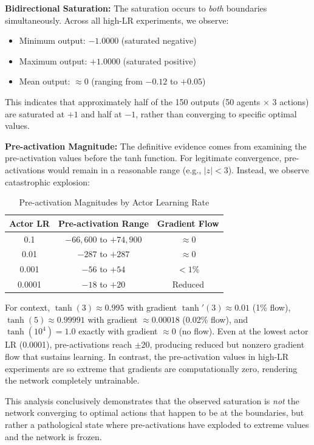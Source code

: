 \textbf{Bidirectional Saturation:} The saturation occurs to \textit{both} boundaries simultaneously. Across all high-LR experiments, we observe:
\begin{itemize}
    \item Minimum output: $-1.0000$ (saturated negative)
    \item Maximum output: $+1.0000$ (saturated positive)
    \item Mean output: $\approx 0$ (ranging from $-0.12$ to $+0.05$)
\end{itemize}
This indicates that approximately half of the 150 outputs (50 agents $\times$ 3 actions) are saturated at $+1$ and half at $-1$, rather than converging to specific optimal values.

\textbf{Pre-activation Magnitude:} The definitive evidence comes from examining the pre-activation values before the tanh function. For legitimate convergence, pre-activations would remain in a reasonable range (e.g., $|z| < 3$). Instead, we observe catastrophic explosion:

\begin{table}[htbp]
\caption{Pre-activation Magnitudes by Actor Learning Rate}
\label{tab:preactivation}
\centering
\small
\begin{tabular}{ccc}
\toprule
\textbf{Actor LR} & \textbf{Pre-activation Range} & \textbf{Gradient Flow} \\
\midrule
0.1 & $-66,600$ to $+74,900$ & $\approx 0$ \\
0.01 & $-287$ to $+287$ & $\approx 0$ \\
0.001 & $-56$ to $+54$ & $< 1\%$ \\
0.0001 & $-18$ to $+20$ & Reduced \\
\bottomrule
\end{tabular}
\end{table}

For context, $\tanh(3) \approx 0.995$ with gradient $\tanh'(3) \approx 0.01$ (1\% flow), $\tanh(5) \approx 0.99991$ with gradient $\approx 0.00018$ (0.02\% flow), and $\tanh(10^4) = 1.0$ exactly with gradient $\approx 0$ (no flow). Even at the lowest actor LR (0.0001), pre-activations reach $\pm 20$, producing reduced but nonzero gradient flow that sustains learning. In contrast, the pre-activation values in high-LR experiments are so extreme that gradients are computationally zero, rendering the network completely untrainable.

This analysis conclusively demonstrates that the observed saturation is \textit{not} the network converging to optimal actions that happen to be at the boundaries, but rather a pathological state where pre-activations have exploded to extreme values and the network is frozen.

